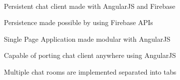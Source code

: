 \documentclass[]{deedy-resume-openfont}
\begin{document}
\begin{minipage}[t]{0.66\textwidth}
 \\
\begin{tightemize}
\item Persistent chat client made with AngularJS and Firebase
\item Persistence made possible by using Firebase APIs
\item Single Page Application made modular with AngularJS
\item Capable of porting chat client anywhere using AngularJS
\item Multiple chat rooms are implemented separated into tabs 
\end{tightemize}
\sectionsep



\end{minipage} 
\end{document}

